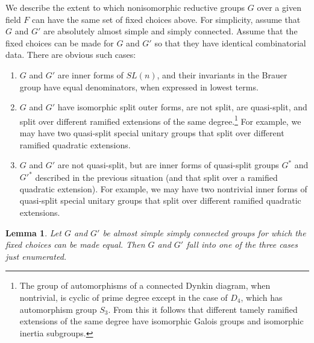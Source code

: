 \documentclass[12pt]{amsart}
\theoremstyle{plain}
\newtheorem{lem}[thm]{Lemma}
\theoremstyle{definition}
\begin{document}
We describe the extent to which nonisomorphic reductive groups $G$
over a given field $F$ can have the same set of fixed choices above.
For simplicity, assume that $G$ and $G'$ are absolutely almost simple
and simply connected.  Assume that the fixed choices can be made for
$G$ and $G'$ so that they have identical combinatorial data.  There
are obvious such cases:
\begin{enumerate}
\item $G$ and $G'$ are inner forms of $SL(n)$, and their invariants in
  the Brauer group have equal denominators, when expressed in lowest terms.
\item $G$ and $G'$ have isomorphic split outer forms, are not split,
  are quasi-split, and split over different ramified extensions of the
  same degree.\footnote{The group of automorphisms of a connected
    Dynkin diagram, when nontrivial, is cyclic of prime degree except
    in the case of $D_4$, which has automorphism group $S_3$.  From
    this it follows that different tamely ramified extensions of the
    same degree have isomorphic Galois groups and isomorphic inertia
    subgroups.}  For example, we may have two quasi-split special
  unitary groups that split over different ramified quadratic
  extensions.
\item $G$ and $G'$ are not quasi-split, but are inner forms of
  quasi-split groups $G^*$ and $G'^{*}$ described in the previous
  situation (and that split over a ramified quadratic extension).  
  For example, we may have two nontrivial inner forms of
  quasi-split special unitary groups that split over different
  ramified quadratic extensions.
\end{enumerate}

\begin{lem} Let $G$ and $G'$ be almost simple simply connected groups
  for which the fixed choices can be made equal.  Then $G$ and $G'$
  fall into one of the three cases just enumerated.
\end{lem}
\end{document}
